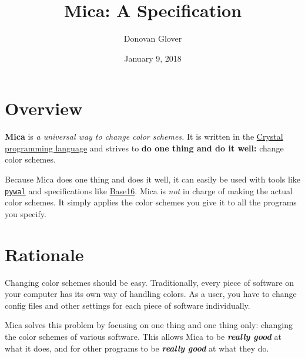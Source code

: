 \documentclass{article}
\title{Mica: A Specification}
\author{Donovan Glover}
\date{January 9, 2018}
\theoremstyle{definition}
\begin{document}

    \maketitle
    \tableofcontents

    \newpage


    \section{Overview}

    \textbf{Mica} is \emph{a universal way to change color schemes.} It is written in the \href{https://crystal-lang.org}{Crystal programming language} and strives to \textbf{do one thing and do it well:} change color schemes.

    Because Mica does one thing and does it well, it can easily be used with tools like \texttt{\href{https://github.com/dylanaraps/pywal}{pywal}} and specifications like \href{https://github.com/chriskempson/base16}{Base16}. Mica is \emph{not} in charge of making the actual color schemes. It simply applies the color schemes you give it to all the programs you specify.


    \section{Rationale}

    Changing color schemes should be easy. Traditionally, every piece of software on your computer has its own way of handling colors. As a user, you have to change config files and other settings for each piece of software individually.

    Mica solves this problem by focusing on one thing and one thing only: changing the color schemes of various software. This allows Mica to be \emph{\textbf{really good}} at what it does, and for other programs to be \emph{\textbf{really good}} at what they do.

\end{document}
